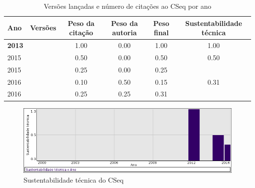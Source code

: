\begin{table}[H]
\caption{Versões lançadas e número de citações ao CSeq por ano}
\centering
\begin{tabular}{| l | c | c | c | c | c |}
  \hline
  Ano & Versões & Peso da citação & Peso da autoria & Peso final & Sustentabilidade técnica \\
  \hline
            {\bf 2013}
          &
          
          &
          1.00
          &
          0.00
          &
          1.00
          &
            {\color{blue} 1.00}
          \\
\hline
            2015
          &
          
          &
          0.50
          &
          0.00
          &
          0.50
          &
            {\color{blue} 0.50}
          \\
            2015
          &
          
          &
          0.25
          &
          0.00
          &
          0.25
          &
          \\
\hline
            2016
          &
          
          &
          0.10
          &
          0.50
          &
          0.15
          &
            {\color{red} 0.31}
          \\
            2016
          &
          
          &
          0.25
          &
          0.25
          &
          0.31
          &
          \\
\hline
\end{tabular}
\end{table}

\begin{figure}[h]
  \center
  \includegraphics[scale=0.50]{imagens/softwares-charts/cseq.png}
  \caption{Sustentabilidade técnica do CSeq}
\end{figure}


